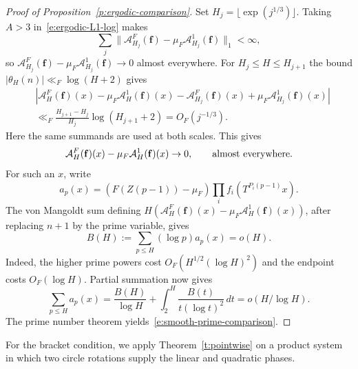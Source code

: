 \documentclass[12pt]{amsart}
\newcommand{\1}{\mathbf 1}
\theoremstyle{definition}
\begin{document}
\begin{proof}[Proof of Proposition~\ref{p:ergodic-comparison}]
Set \(H_j=\lfloor\exp(j^{1/3})\rfloor\). Taking \(A>3\)
in~\eqref{e:ergodic-L1-log} makes 
\[\sum_j\|\mathcal A_{H_j}^F(\mathbf f)-\mu_F\mathcal A_{H_j}^1(\mathbf f)\|_1 <\infty,\] 
so \(\mathcal A_{H_j}^F(\mathbf f)-\mu_F\mathcal A_{H_j}^1(\mathbf f)\to0\) almost everywhere. For \(H_j\le H\le H_{j+1}\)
the bound \(|\theta_H(n)|\ll_F\log(H+2)\) gives
\begin{align*}
     &|\mathcal A_{H}^F(\mathbf f)(x)-\mu_F\mathcal A_{H}^1(\mathbf f)(x)-\mathcal A_{H_j}^F(\mathbf f)(x)+\mu_F\mathcal A_{H_j}^1(\mathbf f)(x)|\\
 &\ll_F \frac{H_{j+1}-H_j}{H_j}\log(H_{j+1}+2)
 =O_F(j^{-1/3}).
\end{align*}
Here the same summands are used at both scales. This gives
\[\mathcal A_{H}^F(\mathbf f)(x)-\mu_F\mathcal A_{H}^1(\mathbf f)(x)\to0, \qquad \textup{almost everywhere.} \] 
For such an \(x\), write
\[a_p(x)=(F(Z(p-1))-\mu_F)\prod_i f_i(T^{P_i(p-1)}x).\]
The von Mangoldt sum defining \(H(\mathcal A_{H}^F(\mathbf f)(x)-\mu_F\mathcal A_{H}^1(\mathbf f)(x))\), after replacing \(n+1\)
by the prime variable, gives
\[B(H):=\sum_{p\le H}(\log p)a_p(x)=o(H).\] Indeed, the higher
prime powers cost \(O_F(H^{1/2}(\log H)^2)\) and the endpoint
costs \(O_F(\log H)\). Partial summation now gives
\[
 \sum_{p\le H}a_p(x)
 =\frac{B(H)}{\log H}+\int_2^H\frac{B(t)}{t(\log t)^2}\,dt
 =o(H/\log H).
\]
The prime number theorem yields~\eqref{e:smooth-prime-comparison}.
\end{proof}

For the bracket condition, we apply Theorem~\ref{t:pointwise}
on a product system in which two circle rotations supply the
linear and quadratic phases.
\end{document}
